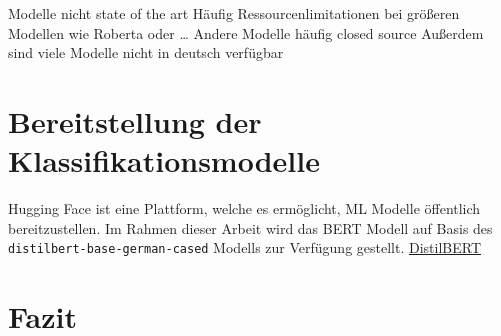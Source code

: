 Modelle nicht state of the art
Häufig Ressourcenlimitationen bei größeren Modellen wie Roberta oder \dots
Andere Modelle häufig closed source
Außerdem sind viele Modelle nicht in deutsch verfügbar

\section{Bereitstellung der Klassifikationsmodelle} \label{sec:crispDm_3}

Hugging Face ist eine Plattform, welche es ermöglicht, \ac{ML} Modelle öffentlich bereitzustellen. Im Rahmen dieser Arbeit wird das \ac{BERT} Modell auf Basis des \texttt{distilbert-base-german-cased} Modells zur Verfügung gestellt. \href{https://huggingface.co/felixhoffmnn/GePart}{DistilBERT}

\section{Fazit} \label{sec:crispConclusion_2}

